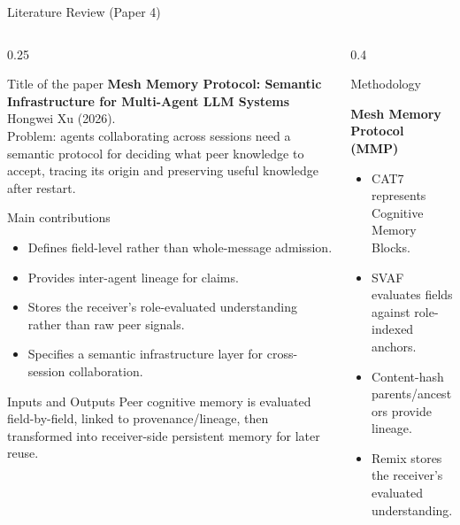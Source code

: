 \begin{frame}{Literature Review (Paper 4)}
\begin{columns}[T]
  \begin{column}{0.25\textwidth}
    \begin{block}{Title of the paper \cite{xu26}}
      \tiny \textbf{Mesh Memory Protocol: Semantic Infrastructure for Multi-Agent LLM Systems}\\[2pt] Hongwei Xu (2026).\\[2pt] Problem: agents collaborating across sessions need a semantic protocol for deciding what peer knowledge to accept, tracing its origin and preserving useful knowledge after restart.
    \end{block}
    \vspace{0.12cm}
    \begin{block}{Main contributions}
      \tiny
      \begin{itemize}\setlength\itemsep{1pt}
      \item Defines field-level rather than whole-message admission.
\item Provides inter-agent lineage for claims.
\item Stores the receiver's role-evaluated understanding rather than raw peer signals.
\item Specifies a semantic infrastructure layer for cross-session collaboration.
      \end{itemize}
    \end{block}
    \vspace{0.12cm}
    \begin{block}{Inputs and Outputs}
      \tiny Peer cognitive memory is evaluated field-by-field, linked to provenance/lineage, then transformed into receiver-side persistent memory for later reuse.
    \end{block}
  \end{column}

  \begin{column}{0.4\textwidth}
    \begin{block}{Methodology}
    \tiny
    \begin{center}
    \textbf{Mesh Memory Protocol (MMP)}
    \end{center}
    \begin{itemize}\setlength\itemsep{1pt}
    \item CAT7 represents Cognitive Memory Blocks.
\item SVAF evaluates fields against role-indexed anchors.
\item Content-hash parents/ancestors provide lineage.
\item Remix stores the receiver's evaluated understanding.
    \end{itemize}
    \end{block}


\end{column}
\end{columns}
\end{frame}
